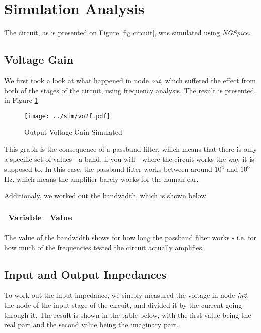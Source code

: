 \clearpage

\section{Simulation Analysis}
\label{sec:simulation}

The circuit, as is presented on Figure \ref{fig:circuit}, was simulated using \textit{NGSpice}.

\subsection{Voltage Gain}

We first took a look at what happened in node \textit{out}, which suffered the effect from both of the stages of the circuit, using frequency analysis. The result is presented in Figure \ref{fig:vo2f}.

\begin{figure}[h] \centering
\texttt{[image: ../sim/vo2f.pdf]}
\caption{Output Voltage Gain Simulated}
\label{fig:vo2f}
\end{figure}

This graph is the consequence of a passband filter, which means that there is only a specific set of values - a band, if you will - where the circuit works the way it is supposed to. In this case, the passband filter works between around $10^4$ and $10^6$ Hz, which means the amplifier barely works for the human ear.

Additionaly, we worked out the bandwidth, which is shown below.

\begin{tabular}{|l|r|}
  \hline    
  {\bf Variable} & {\bf Value} \\ \hline
  
\end{tabular}

The value of the bandwidth shows for how long the passband filter works - i.e. for how much of the frequencies tested the circuit actually amplifies.

\subsection{Input and Output Impedances}

To work out the input impedance, we simply measured the voltage in node \textit{in2}, the node of the input stage of the circuit, and divided it by the current going through it. The result is shown in the table below, with the first value being the real part and the second value being the imaginary part.

